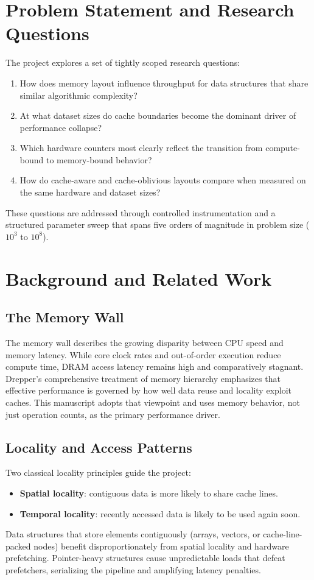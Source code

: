 \documentclass[11pt]{article}
\begin{document}
\section{Problem Statement and Research Questions}
The project explores a set of tightly scoped research questions:
\begin{enumerate}[label=\textbf{Q\arabic*}.]
    \item How does memory layout influence throughput for data structures that share similar algorithmic complexity?
    \item At what dataset sizes do cache boundaries become the dominant driver of performance collapse?
    \item Which hardware counters most clearly reflect the transition from compute-bound to memory-bound behavior?
    \item How do cache-aware and cache-oblivious layouts compare when measured on the same hardware and dataset sizes?
\end{enumerate}

These questions are addressed through controlled instrumentation and a structured parameter sweep that spans five orders of magnitude in problem size (\(10^3\) to \(10^8\)).

\section{Background and Related Work}
\subsection{The Memory Wall}
The memory wall describes the growing disparity between CPU speed and memory latency. While core clock rates and out-of-order execution reduce compute time, DRAM access latency remains high and comparatively stagnant. Drepper's comprehensive treatment of memory hierarchy \citep{drepper2007} emphasizes that effective performance is governed by how well data reuse and locality exploit caches. This manuscript adopts that viewpoint and uses memory behavior, not just operation counts, as the primary performance driver.

\subsection{Locality and Access Patterns}
Two classical locality principles guide the project:
\begin{itemize}
    \item \textbf{Spatial locality}: contiguous data is more likely to share cache lines.
    \item \textbf{Temporal locality}: recently accessed data is likely to be used again soon.
\end{itemize}
Data structures that store elements contiguously (arrays, vectors, or cache-line-packed nodes) benefit disproportionately from spatial locality and hardware prefetching. Pointer-heavy structures cause unpredictable loads that defeat prefetchers, serializing the pipeline and amplifying latency penalties.
\end{document}
